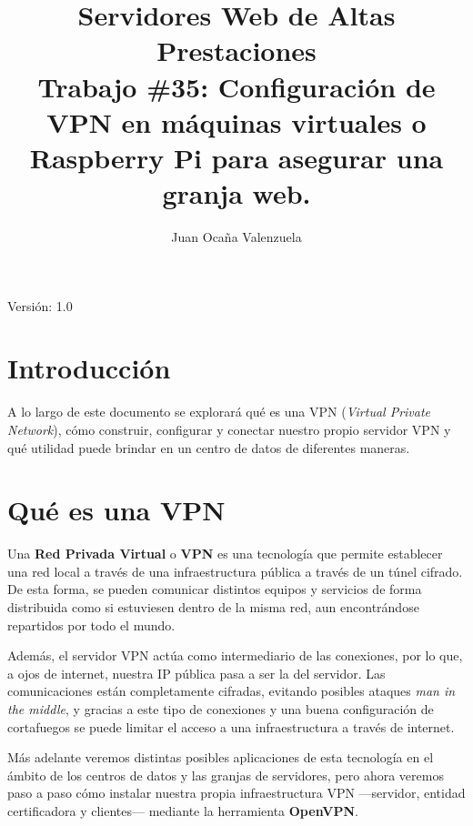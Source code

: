 \documentclass[11pt,a4paper]{article}
\author{Juan Ocaña Valenzuela}
\title{\textbf{Servidores Web de Altas Prestaciones} \\ 
 \textbf{Trabajo \#35:} Configuración de VPN en máquinas virtuales o Raspberry Pi para asegurar una granja web.}
\begin{document}
\thispagestyle{empty}

\maketitle

\begin{center}

Versión: 1.0
\end{center}

\newpage

\tableofcontents

\newpage

\section{Introducción}

A lo largo de este documento se explorará qué es una VPN (\textit{Virtual Private Network}), cómo construir, configurar y conectar nuestro propio servidor VPN y qué utilidad puede brindar en un centro de datos de diferentes maneras.

\section{Qué es una VPN}

Una \textbf{Red Privada Virtual} o \textbf{VPN} es una tecnología que permite establecer una red local a través de una infraestructura pública a través de un túnel cifrado. De esta forma, se pueden comunicar distintos equipos y servicios de forma distribuida como si estuviesen dentro de la misma red, aun encontrándose repartidos por todo el mundo. 

\medskip

Además, el servidor VPN actúa como intermediario de las conexiones, por lo que, a ojos de internet, nuestra IP pública pasa a ser la del servidor. Las comunicaciones están completamente cifradas, evitando posibles ataques \textit{man in the middle}, y gracias a este tipo de conexiones y una buena configuración de cortafuegos se puede limitar el acceso a una infraestructura a través de internet. 

\medskip

Más adelante veremos distintas posibles aplicaciones de esta tecnología en el ámbito de los centros de datos y las granjas de servidores, pero ahora veremos paso a paso cómo instalar nuestra propia infraestructura VPN ---servidor, entidad certificadora y clientes--- mediante la herramienta \textbf{OpenVPN}.
\end{document}
